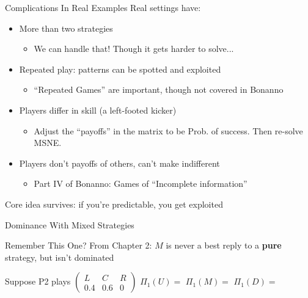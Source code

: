\begin{frame}{Complications In Real Examples}
Real settings have:
\begin{itemize}
    \item More than two strategies
    \begin{itemize}
        \item<2-> We can handle that! Though it gets harder to solve...
    \end{itemize}
    \item Repeated play: patterns can be spotted and exploited
    \begin{itemize}
        \item<3-> ``Repeated Games'' are important, though not covered in Bonanno
    \end{itemize}
    \item Players differ in skill (a left-footed kicker)
    \begin{itemize}
        \item<4-> Adjust the ``payoffs'' in the matrix to be Prob. of success. Then re-solve MSNE.
    \end{itemize}
    \item Players don't payoffs of others, can't make indifferent
    \begin{itemize}
        \item<5-> Part IV of Bonanno: Games of ``Incomplete information''
    \end{itemize}
\end{itemize}
\bsk
Core idea survives: if you're predictable, you get exploited
\vfill
\vspace{-0.4in}
\end{frame}


\begin{frame}[standout]
Dominance With Mixed Strategies
\end{frame}

\begin{frame}{Remember This One?}
From Chapter 2: $M$ is never a best reply to a \textbf{pure} strategy, but isn't dominated
\bsk
\centering
\begin{matrixgame}[top={L, C, R}, left={U, M, D}, player names={Player 1, Player 2}]
\end{matrixgame}
\bsk
\raggedright
Suppose P2 plays $\begin{pmatrix} L & C & R \\ 0.4 & 0.6 & 0\end{pmatrix}$
\bsk
$\Pi_1(U)=$ \hspace{0.9in} $\Pi_1(M)=$ \hspace{0.9in} $\Pi_1(D)=$
\bsk
{}
\vspace{-0.3in}
\end{frame}

